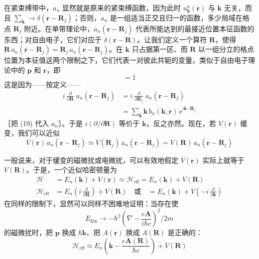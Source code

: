 在紧束缚带中，$a_n$ 显然就是原来的紧束缚函数，因为此时 $u^n_{\mathbf{k}}(\mathbf{r})$ 与 $\mathbf{k}$ 无关，而且 $\sum_{\mathbf{k}} \to \delta(\mathbf{r} - \mathbf{R}_j)$；否则，$a_n$ 是一组适当正交且归一的函数，多少局域在格点 $\mathbf{R}_j$ 附近。在单带理论中，$a_n(\mathbf{r} - \mathbf{R}_j)$ 代表所能达到的最接近位置本征函数的东西；对自由电子，它们对应于 $\delta(\mathbf{r} - \mathbf{R})$。让我们定义一个算符 $\mathbf{R}$，使得 $\mathbf{R}\, a_n(\mathbf{r} - \mathbf{R}_j) = \mathbf{R}_j\, a_n(\mathbf{r} - \mathbf{R}_j)$。在 $\mathbf{k}$ 只占据第一区、而 $\mathbf{R}$ 以一组分立的格点位置为本征值这两个限制之下，它们代表一对彼此共轭的变量，类似于自由电子理论中的 $\mathbf{p}$ 和 $\mathbf{r}$，即
\begin{equation*}
[\mathbf{k}, \mathbf{R}] = 1
\end{equation*}
这是因为——按定义——
\begin{align*}
i\,\frac{\partial}{\partial\mathbf{R}}\; a_n(\mathbf{r} - \mathbf{R}_j) &= i\,\frac{\partial}{\partial\mathbf{R}_j}\; a_n(\mathbf{r} - \mathbf{R}_j) \\
&= \sum_{\mathbf{k}} \mathbf{k}\, b_n(\mathbf{k},\mathbf{r})\, \mathrm{e}^{i\mathbf{k}\cdot\mathbf{R}_j}
\end{align*}
［把 (19) 代入 $a_n$］。于是 $i(\partial/\partial\mathbf{R})$ 等价于 $\mathbf{k}$，反之亦然。现在，若 $V(\mathbf{r})$ 缓变，我们可以近似
\begin{equation*}
V(\mathbf{r})\, a_n(\mathbf{r} - \mathbf{R}_j) \simeq V(\mathbf{R}_j)\, a_n(\mathbf{r} - \mathbf{R}_j) = V(\mathbf{R})\, a_n(\mathbf{r} - \mathbf{R}_j)
\end{equation*}


一般说来，对于缓变的磁微扰或电微扰，可以有效地假定 $V(\mathbf{r})$ 实际上就等于 $V(\mathbf{R})$。于是，一个近似哈密顿量为
\begin{align*}
\mathcal{H} &= E_n(\mathbf{k}) + V(\mathbf{r}) \simeq \mathcal{H}_{\text{eff}} = E_n(\mathbf{k}) + V(\mathbf{R}) \\
\mathcal{H}_{\text{eff}} &= E_n\!\left(i\,\frac{\partial}{\partial\mathbf{R}}\right) + V(\mathbf{R}) \quad\text{或}\quad = E_n(\mathbf{k}) + V\!\left(-i\,\frac{\partial}{\partial\mathbf{k}}\right)
\end{align*}
在同样的限制下，显然可以同样不困难地证明：当存在使
\begin{equation*}
E_{\text{kin}} \to -\hbar^2\left(\nabla - \frac{e\mathbf{A}}{i\hbar c}\right)^{\!2}\Big/2m
\end{equation*}
的磁微扰时，把 $\mathbf{p}$ 换成 $\hbar\mathbf{k}$、把 $A(\mathbf{r})$ 换成 $A(\mathbf{R})$ 是正确的：
\begin{equation*}
\mathcal{H}_{\text{eff}} \simeq E_n\!\left(\mathbf{k} - \frac{e\mathbf{A}(\mathbf{R})}{\hbar c}\right) + V(\mathbf{R})
\end{equation*}

